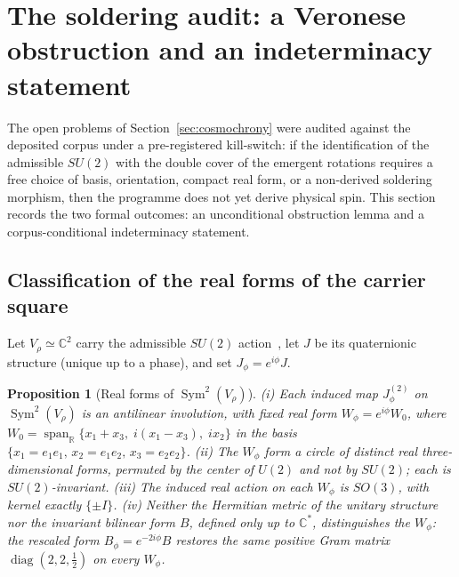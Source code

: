 \documentclass[11pt,a4paper]{article}
\newtheorem{proposition}{Proposition}
\begin{document}
\section{The soldering audit: a Veronese obstruction and an indeterminacy statement}
\label{sec:audit}

The open problems of Section~\ref{sec:cosmochrony} were audited against the deposited corpus under a
pre-registered kill-switch: if the identification of the admissible $SU(2)$ with the double cover of the
emergent rotations requires a free choice of basis, orientation, compact real form, or a non-derived
soldering morphism, then the programme does not yet derive physical spin.
This section records the two formal outcomes: an unconditional obstruction lemma and a corpus-conditional
indeterminacy statement.

\subsection{Classification of the real forms of the carrier square}
\label{sec:realforms}

Let $V_\rho \simeq \mathbb{C}^2$ carry the admissible $SU(2)$ action~\cite{Beau2026a33}, let $J$ be its
quaternionic structure (unique up to a phase), and set $J_\phi = e^{i\phi} J$.

\begin{proposition}[Real forms of $\operatorname{Sym}^2(V_\rho)$]
\label{prop:realforms}
(i) Each induced map $J_\phi^{(2)}$ on $\operatorname{Sym}^2(V_\rho)$ is an antilinear involution, with
fixed real form $W_\phi = e^{i\phi} W_0$, where
$W_0 = \operatorname{span}_{\mathbb{R}}\{x_1 + x_3,\; i(x_1 - x_3),\; i x_2\}$ in the basis
$\{x_1 = e_1 e_1,\, x_2 = e_1 e_2,\, x_3 = e_2 e_2\}$.
(ii) The $W_\phi$ form a circle of distinct real three-dimensional forms, permuted by the center of
$U(2)$ and not by $SU(2)$; each is $SU(2)$-invariant.
(iii) The induced real action on each $W_\phi$ is $SO(3)$, with kernel exactly $\{\pm I\}$.
(iv) Neither the Hermitian metric of the unitary structure nor the invariant bilinear form $B$, defined
only up to $\mathbb{C}^*$, distinguishes the $W_\phi$: the rescaled form $B_\phi = e^{-2i\phi} B$
restores the same positive Gram matrix $\operatorname{diag}(2, 2, \tfrac12)$ on every $W_\phi$.
\end{proposition}
\end{document}
